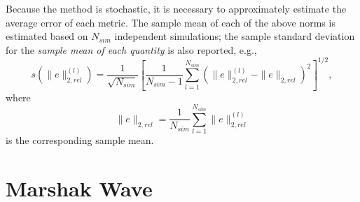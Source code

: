 Because the method is stochastic, it is necessary to approximately estimate the average
error of each metric.
The sample mean of each of the above norms is estimated based on $N_{sim}$ independent
simulations; the sample standard deviation for the \emph{sample mean of each quantity} is also reported, e.g.,
\begin{equation}
    s\left(\|e\|^{(l)}_{2,rel}\right) = \frac{1}{\sqrt{N_{sim}}}\left[\frac{1}{N_{sim}-1}\sum_{l=1}^{N_{sim}} \left(
    \|e\|_{2,rel}^{(l)} - \|e\|_{2,rel} \right)^2\right]^{1/2},
\end{equation}
where
\begin{equation}\label{eq:avg_err}
    \|e\|_{2,rel}=\frac{1}{N_{sim}}\sum_{l=1}^{N_{sim}}\|e\|_{2,rel}^{(l)}
\end{equation}
is the corresponding sample mean.

\section{Marshak Wave}
\label{sec:marsh}

